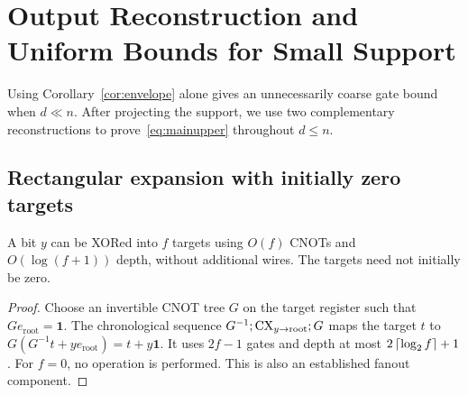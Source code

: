 \section{Output Reconstruction and Uniform Bounds for Small Support}\label{sec:small}
Using Corollary~\ref{cor:envelope} alone gives an unnecessarily coarse gate bound when $d\ll n$. After projecting the support, we use two complementary reconstructions to prove~\eqref{eq:mainupper} throughout $d\le n$.

\subsection{Rectangular expansion with initially zero targets}
\begin{lemma}\label{lem:fanout}
A bit $y$ can be XORed into $f$ targets using $O(f)$ CNOTs and $O(\log(f+1))$ depth, without additional wires. The targets need not initially be zero.
\end{lemma}
\begin{proof}
Choose an invertible CNOT tree $G$ on the target register such that $Ge_{\mathrm{root}}=\mathbf1$. The chronological sequence $G^{-1};\mathrm{CX}_{y\to\mathrm{root}};G$ maps the target $t$ to
$G(G^{-1}t+ye_{\mathrm{root}})=t+y\mathbf1$. It uses $2f-1$ gates and depth at most $2\left\lceil \log_2 f\right\rceil+1$. For $f=0$, no operation is performed. This is also an established fanout component\cite[Lemma~3]{luo2025}.
\end{proof}

